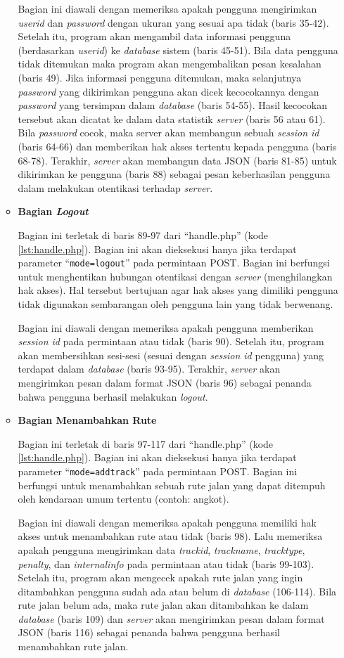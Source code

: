 \documentclass[a4paper,twoside]{article}
\begin{document}
\begin{enumerate}
\begin{itemize}
Bagian ini diawali dengan memeriksa apakah pengguna mengirimkan \textit{userid} dan \textit{password} dengan ukuran yang sesuai apa tidak (baris 35-42). Setelah itu, program akan mengambil data informasi pengguna (berdasarkan \textit{userid}) ke \textit{database} sistem (baris 45-51). Bila data pengguna tidak ditemukan maka program akan mengembalikan pesan kesalahan (baris 49). Jika informasi pengguna ditemukan, maka selanjutnya \textit{password} yang dikirimkan pengguna akan dicek kecocokannya dengan \textit{password} yang tersimpan dalam \textit{database} (baris 54-55). Hasil kecocokan tersebut akan dicatat ke dalam data statistik \textit{server} (baris 56 atau 61). Bila \textit{password} cocok, maka server akan membangun sebuah \textit{session id} (baris 64-66) dan memberikan hak akses tertentu kepada pengguna (baris 68-78). Terakhir, \textit{server} akan membangun data JSON (baris 81-85) untuk dikirimkan ke pengguna (baris 88) sebagai pesan keberhasilan pengguna dalam melakukan otentikasi terhadap \textit{server}.

\item \textbf{Bagian \textit{Logout}}

Bagian ini terletak di baris 89-97 dari ``handle.php'' (kode \ref{lst:handle.php}). Bagian ini akan dieksekusi hanya jika terdapat parameter ``\texttt{mode=logout}'' pada permintaan POST. Bagian ini berfungsi untuk menghentikan hubungan otentikasi dengan \textit{server} (menghilangkan hak akses). Hal tersebut bertujuan agar hak akses yang dimiliki pengguna tidak digunakan sembarangan oleh pengguna lain yang tidak berwenang.

Bagian ini diawali dengan memeriksa apakah pengguna memberikan \textit{session id} pada permintaan atau tidak (baris 90). Setelah itu, program akan membersihkan sesi-sesi (sesuai dengan \textit{session id} pengguna) yang terdapat dalam \textit{database} (baris 93-95). Terakhir, \textit{server} akan mengirimkan pesan dalam format JSON (baris 96) sebagai penanda bahwa pengguna berhasil melakukan \textit{logout}.

\item \textbf{Bagian Menambahkan Rute}

Bagian ini terletak di baris 97-117 dari ``handle.php'' (kode \ref{lst:handle.php}). Bagian ini akan dieksekusi hanya jika terdapat parameter ``\texttt{mode=addtrack}'' pada permintaan POST. Bagian ini berfungsi untuk menambahkan sebuah rute jalan yang dapat ditempuh oleh kendaraan umum tertentu (contoh: angkot).

Bagian ini diawali dengan memeriksa apakah pengguna memiliki hak akses untuk menambahkan rute atau tidak (baris 98). Lalu memeriksa apakah pengguna mengirimkan data \textit{trackid}, \textit{trackname}, \textit{tracktype}, \textit{penalty}, dan \textit{internalinfo} pada permintaan atau tidak (baris 99-103). Setelah itu, program akan mengecek apakah rute jalan yang ingin ditambahkan pengguna sudah ada atau belum di \textit{database} (106-114). Bila rute jalan belum ada, maka rute jalan akan ditambahkan ke dalam \textit{database} (baris 109) dan \textit{server} akan mengirimkan pesan dalam format JSON (baris 116) sebagai penanda bahwa pengguna berhasil menambahkan rute jalan.


\end{itemize}
\end{enumerate}
\end{document}
